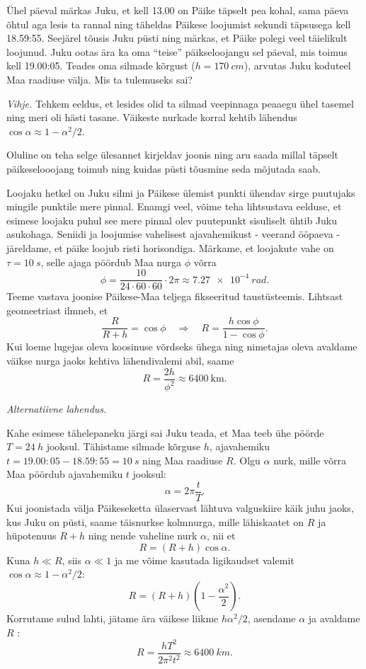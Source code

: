 
Ühel päeval märkas Juku, et kell 13.00 on Päike täpselt pea kohal, sama päeva õhtul aga lesis ta rannal ning täheldas Päikese loojumist sekundi täpsusega kell 18.59:55. Seejärel tõusis Juku püsti ning märkas, et Päike polegi veel täielikult loojunud. Juku ootas ära ka oma \enquote{teise} päikseloojangu sel päeval, mis toimus kell 19.00:05. Teades oma silmade kõrgust ($h = \SI{170}{cm}$), arvutas Juku koduteel Maa raadiuse välja. Mis ta tulemuseks sai?

\emph{Vihje.} Tehkem eeldus, et lesides olid ta silmad veepinnaga peaaegu ühel tasemel ning meri oli hästi tasane. Väikeste nurkade korral kehtib lähendus $\cos \alpha \approx 1 - \alpha^2/2$.

\hint
Oluline on teha selge ülesannet kirjeldav joonis ning aru saada millal täpselt päikeselooojang toimub ning kuidas püsti tõusmine seda mõjutada saab.

\solu
Loojaku hetkel on Juku silmi ja Päikese ülemist punkti ühendav sirge puutujaks mingile punktile mere pinnal. Enamgi veel, võime teha lihtsustava eelduse, et esimese loojaku puhul see mere pinnal olev puutepunkt sisuliselt ühtib Juku asukohaga. Seniidi ja loojumise vahelisest ajavahemikust - veerand ööpaeva - järeldame, et päike loojub risti horisondiga. Märkame, et loojakute vahe on $\tau=\SI{10}{s}$, selle ajaga pöördub Maa nurga $\phi$ võrra
$$
\phi=\frac{10}{24 \cdot 60 \cdot 60} \cdot 2 \pi \approx \SI{7.27e-4}{rad}.
$$
Teeme vastava joonise Päikese-Maa teljega fikseeritud taustüsteemis. Lihtsast geomeetriast ilmneb, et
$$
\frac{R}{R+h}=\cos \phi \quad \Rightarrow \quad R=\frac{h \cos \phi}{1-\cos \phi} .
$$
Kui loeme lugejas oleva koosinuse võrdseks ühega ning nimetajas oleva avaldame väikse nurga jaoks kehtiva lähendivalemi abil, saame
$$
R=\frac{2 h}{\phi^{2}} \approx 6400 \mathrm{~km} .
$$

\emph{Alternatiivne lahendus.}

Kahe esimese tähelepaneku järgi sai Juku teada, et Maa teeb ühe pöörde $T=\SI{24}{h}$ jooksul. Tähistame silmade kõrguse $h$, ajavahemiku $t=19.00: 05-18.59: 55=\SI{10}{s}$ ning Maa raadiuse $R$. Olgu $\alpha$ nurk, mille võrra Maa pöördub ajavahemiku $t$ jooksul:
$$
\alpha=2 \pi \frac{t}{T}.
$$
Kui joonistada välja Päikeseketta ülaservast lähtuva valguskiire käik juhu jaoks, kus Juku on püsti, saame täisnurkse kolmnurga, mille lähiskaatet on $R$ ja hüpotenuus $R+h$ ning nende vaheline nurk $\alpha$, nii et
$$
R=(R+h) \cos \alpha.
$$
Kuna $h \ll R$, siis $\alpha \ll 1$ ja me võime kasutada ligikaudset valemit $\cos \alpha \approx 1-\alpha^{2}/2$:
$$
R=(R+h)\left(1-\frac{\alpha^{2}}{2}\right).
$$
Korrutame sulud lahti, jätame ära väikese liikme $h \alpha^{2} / 2$, asendame $\alpha$ ja avaldame $R$ :
$$
R=\frac{h T^{2}}{2 \pi^{2} t^{2}} \approx \SI{6400}{km}.
$$
\probend